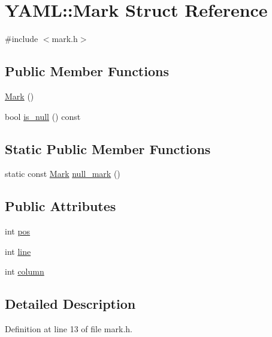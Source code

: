 \hypertarget{struct_y_a_m_l_1_1_mark}{}\section{Y\+A\+ML\+::Mark Struct Reference}
\label{struct_y_a_m_l_1_1_mark}


{\ttfamily \#include $<$mark.\+h$>$}

\subsection*{Public Member Functions}
\begin{DoxyCompactItemize}
\item 
\mbox{\hyperlink{struct_y_a_m_l_1_1_mark_a136aceca957797716dc3fe249cfb21ec}{Mark}} ()
\item 
bool \mbox{\hyperlink{struct_y_a_m_l_1_1_mark_a914cc14d3bc21226285ca9ce31ef07fc}{is\+\_\+null}} () const
\end{DoxyCompactItemize}
\subsection*{Static Public Member Functions}
\begin{DoxyCompactItemize}
\item 
static const \mbox{\hyperlink{struct_y_a_m_l_1_1_mark}{Mark}} \mbox{\hyperlink{struct_y_a_m_l_1_1_mark_a915b7cb23c5fb28a1f2095ce3426f15e}{null\+\_\+mark}} ()
\end{DoxyCompactItemize}
\subsection*{Public Attributes}
\begin{DoxyCompactItemize}
\item 
int \mbox{\hyperlink{struct_y_a_m_l_1_1_mark_ae77fbebfc1c81a3e431a0674759092c2}{pos}}
\item 
int \mbox{\hyperlink{struct_y_a_m_l_1_1_mark_a30f6ac28c5002a88f1109ce64ca7f4ec}{line}}
\item 
int \mbox{\hyperlink{struct_y_a_m_l_1_1_mark_a1e3db10ef37e390ea51bc3540ac560d0}{column}}
\end{DoxyCompactItemize}


\subsection{Detailed Description}


Definition at line 13 of file mark.\+h.




